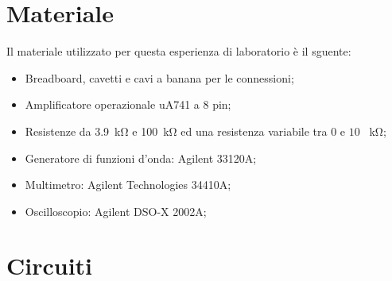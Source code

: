 \section*{Materiale}

Il materiale utilizzato per questa esperienza di laboratorio è il sguente:

\begin{itemize} \itemsep2pt \parskip0pt 
    \item{Breadboard, cavetti e cavi a banana per le connessioni;}
    \item{Amplificatore operazionale uA741 a 8 pin;}
    \item{Resistenze da \SI{3.9}{\kilo\ohm} e \SI{100}{\kilo\ohm} ed una resistenza variabile tra $0$ e $10$ \SI{}{\kilo\ohm};}
    \item{Generatore di funzioni d'onda: Agilent 33120A;}
    \item{Multimetro: Agilent Technologies 34410A;}
    \item{Oscilloscopio: Agilent DSO-X 2002A;}
\end{itemize}

\section*{Circuiti}

